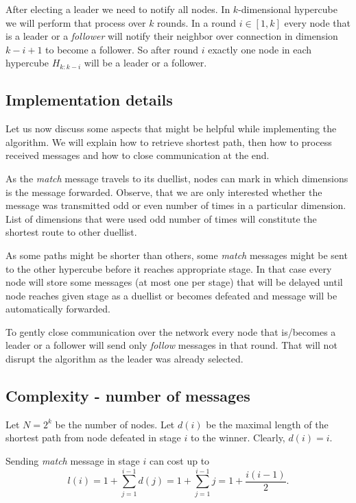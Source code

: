 \documentclass[11pt]{article}
\begin{document}
After electing a leader we need to notify all nodes. In $k$-dimensional hypercube we will perform that process over $k$ rounds. In a round $i\in[1, k]$ every node that is a leader or a \textit{follower} will notify their neighbor over connection in dimension $k-i+1$ to become a follower. So after round $i$ exactly one node in each hypercube $H_{k:k-i}$ will be a leader or a follower.

\subsection*{Implementation details}

Let us now discuss some aspects that might be helpful while implementing the algorithm. We will explain how to retrieve shortest path, then how to process received messages and how to close communication at the end.

As the \textit{match} message travels to its duellist, nodes can mark in which dimensions is the message forwarded. Observe, that we are only interested whether the message was transmitted odd or even number of times in a particular dimension. List of dimensions that were used odd number of times will constitute the shortest route to other duellist.

As some paths might be shorter than others, some \textit{match} messages might be sent to the other hypercube before it reaches appropriate stage. In that case every node will store some messages (at most one per stage) that will be delayed until node reaches given stage as a duellist or becomes defeated and message will be automatically forwarded.

To gently close communication over the network every node that is/becomes a leader or a follower will send only \textit{follow} messages in that round. That will not disrupt the algorithm as the leader was already selected.

\subsection*{Complexity - number of messages}

Let $N = 2^{k}$ be the number of nodes. Let $d(i)$ be the maximal length of the shortest path from node defeated in stage $i$ to the winner. Clearly, $d(i) = i$.

Sending \textit{match} message in stage $i$ can cost up to 
$$l(i) = 1 + \sum_{j=1}^{i-1}d(j) = 1 + \sum_{j=1}^{i-1}j = 1 + \frac{i(i-1)}{2}.$$
\end{document}
